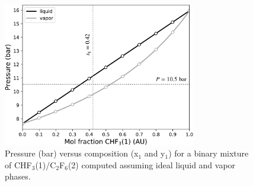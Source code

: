 \begin{figure}[h!]\centering
    \captionsetup{width=0.75\linewidth}
    \includegraphics[width=0.75\textwidth]{./figs/VLE-Ideal-Pxy-P2-F19.pdf}
    \caption{Pressure (bar) versus composition (x$_{1}$ and y$_{1}$) for a binary mixture of CHF$_{\mathrm{3}}$(1)/C$_{\mathrm{2}}$F$_{\mathrm{6}}$(2) computed assuming ideal liquid and vapor phases.}\label{fig-VLE-ideal-problem}
    \end{figure}
    
